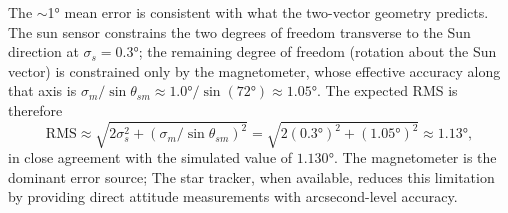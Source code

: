 \documentclass[12pt]{article}
\begin{document}
The $\sim$1° mean error is consistent with what the two-vector geometry predicts. The sun sensor constrains the two degrees of freedom transverse to the Sun direction at $\sigma_s = 0.3°$; the remaining degree of freedom (rotation about the Sun vector) is constrained only by the magnetometer, whose effective accuracy along that axis is $\sigma_m / \sin\theta_{sm} \approx 1.0° / \sin(72°) \approx 1.05°$. The expected RMS is therefore
\[
\text{RMS} \approx \sqrt{2\sigma_s^2 + (\sigma_m/\sin\theta_{sm})^2}
= \sqrt{2(0.3°)^2 + (1.05°)^2}
\approx 1.13°,
\]
in close agreement with the simulated value of $1.130°$. The magnetometer is the dominant error source; The star tracker, when available, reduces this limitation by providing direct attitude measurements with arcsecond-level accuracy.

\newpage
\end{document}
